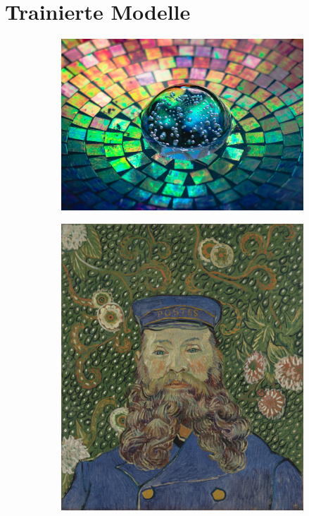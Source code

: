 \section{Trainierte Modelle}
\begin{figure}[H]
    \centering

    \begin{subfigure}[h]{0.24\textwidth}
        \centering
        \quad
    \end{subfigure}
    \begin{subfigure}[h]{0.24\textwidth}
        \centering
        \includegraphics[width=\textwidth]{resources/content/style/crystal_glass_on_a_colorful_background.jpg}
    \end{subfigure}
    \begin{subfigure}[h]{0.24\textwidth}
        \centering
        \includegraphics[width=\textwidth]{resources/content/style/portrait_of_joseph_roulin.jpg}

\end{subfigure}
\end{figure}
